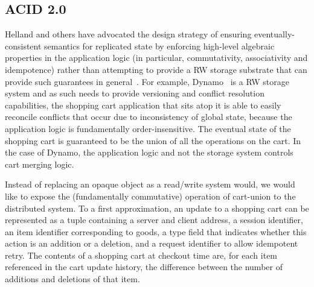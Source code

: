 \subsection{ACID 2.0}


Helland and others have advocated the design strategy of ensuring eventually-consistent 
semantics for replicated state by enforcing high-level algebraic 
properties in the application logic (in particular, commutativity, associativity and 
idempotence) rather than attempting to provide a RW storage substrate that can provide
such guarantees in general~\cite{quicksand, beyond}.  For example, Dynamo~\cite{dynamo} 
is a RW storage system
and as such needs to provide versioning and conflict resolution capabilities, the shopping
cart application that sits atop it is able to easily reconcile conflicts that occur due to inconsistency of global state, because the application logic is fundamentally order-insensitive.
The eventual state of the shopping cart is guaranteed to be the union of all the operations on
the cart.  In the case of Dynamo, the application logic and not the storage system controls
cart merging logic.

Instead of replacing an opaque object as a read/write system would,
we would like to expose the (fundamentally commutative) operation of cart-union to the distributed system.  
To a first approximation, an update to a shopping cart
can be represented as a tuple containing a server and client address, a session identifier,
an item identifier corresponding to goods, a type field that indicates whether this action
is an addition or a deletion, and a request identifier to allow idempotent retry.  The contents
of a shopping cart at checkout time are, for each item referenced in the cart update history, 
the difference between the number of additions and deletions of that item.

